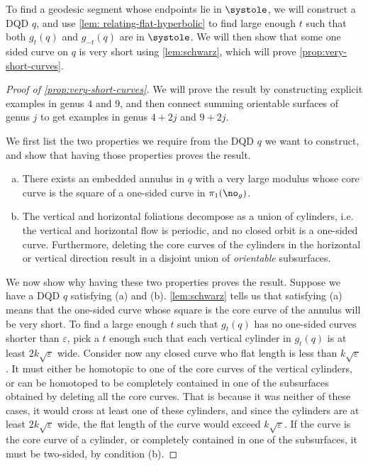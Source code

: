\documentclass[12pt, reqno]{amsart}
\begin{document}
To find a geodesic segment whose endpoints lie in $\systole$, we will construct a DQD $q$, and use \autoref{lem: relating-flat-hyperbolic} to find large enough $t$ such that both $g_t(q)$ and $g_{-t}(q)$ are in $\systole$.
We will then show that some one sided curve on $q$ is very short using \autoref{lem:schwarz}, which will prove \autoref{prop:very-short-curves}.

\begin{proof}[Proof of \autoref{prop:very-short-curves}]
  We will prove the result by constructing explicit examples in genus $4$ and $9$, and then connect summing orientable surfaces of genus $j$ to get examples in genus $4+2j$ and $9+2j$.

  We first list the two properties we require from the DQD $q$ we want to construct, and show that having those properties proves the result.
  \begin{enumerate}[(a)]
  \item There exists an embedded annulus in $q$ with a very large modulus whose core curve is the square of a one-sided curve in $\pi_1(\no_g)$.
  \item The vertical and horizontal foliations decompose as a union of cylinders, i.e. the vertical and horizontal flow is periodic, and no closed orbit is a one-sided curve. Furthermore, deleting the core curves of the cylinders in the horizontal or vertical direction result in a disjoint union of \emph{orientable} subsurfaces.
  \end{enumerate}

We now show why having these two properties proves the result.
Suppose we have a DQD $q$ satisfying (a) and (b).
\autoref{lem:schwarz} tells us that satisfying (a) means that the one-sided curve whose square is the core curve of the annulus will be very short.
To find a large enough $t$ such that $g_t(q)$ has no one-sided curves shorter than $\varepsilon$, pick a $t$ enough such that each vertical cylinder in $g_t(q)$ is at least $2k \sqrt{\varepsilon}$ wide.
Consider now any closed curve who flat length is less than $k \sqrt{\varepsilon}$.
It must either be homotopic to one of the core curves of the vertical cylinders, or can be homotoped to be completely contained in one of the subsurfaces obtained by deleting all the core curves.
That is because it was neither of these cases, it would cross at least one of these cylinders, and since the cylinders are at least $2k \sqrt{\varepsilon}$ wide, the flat length of the curve would exceed $k \sqrt{\varepsilon}$.
If the curve is the core curve of a cylinder, or completely contained in one of the subsurfaces, it must be two-sided, by condition (b).


\end{proof}
\end{document}
